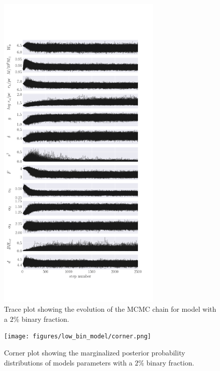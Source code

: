 \begin{figure}
	\centering
	\includegraphics[width=0.7\textwidth]{figures/low_bin_model/walkers.png}
	\caption{Trace plot showing the evolution of the MCMC chain for model with a $2\%$ binary
		fraction.}
	\label{fig:lowbin_walkers}
\end{figure}

\begin{figure}
	\centering
	\texttt{[image: figures/low\_bin\_model/corner.png]}
	\caption{Corner plot showing the marginalized posterior probability distributions of models
		parameters with a $2\%$ binary fraction.}
	\label{fig:lowbin_corner}
\end{figure}



